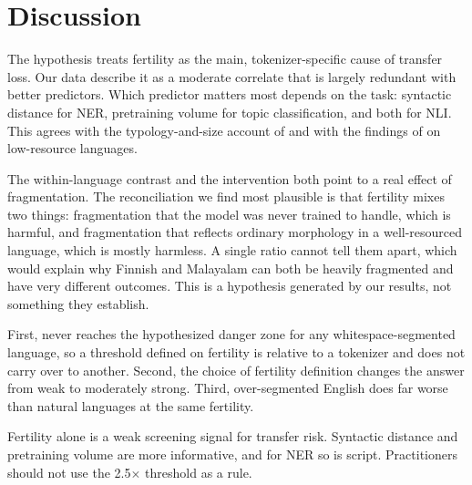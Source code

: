 \section{Discussion}
\label{sec:discussion}

The hypothesis treats fertility as the main, tokenizer-specific cause of transfer loss.
Our data describe it as a moderate correlate that is largely redundant with better predictors.
Which predictor matters most depends on the task: syntactic distance for NER, pretraining volume for topic classification, and both for NLI.
This agrees with the typology-and-size account of \citet{lauscher2020zero} and with the findings of \citet{wu2020all} on low-resource languages.

The within-language contrast and the intervention both point to a real effect of fragmentation.
The reconciliation we find most plausible is that fertility mixes two things: fragmentation that the model was never trained to handle, which is harmful, and fragmentation that reflects ordinary morphology in a well-resourced language, which is mostly harmless.
A single ratio cannot tell them apart, which would explain why Finnish and Malayalam can both be heavily fragmented and have very different outcomes.
This is a hypothesis generated by our results, not something they establish.

First, \xlmr never reaches the hypothesized danger zone for any whitespace-segmented language, so a threshold defined on fertility is relative to a tokenizer and does not carry over to another.
Second, the choice of fertility definition changes the \sib answer from weak to moderately strong.
Third, over-segmented English does far worse than natural languages at the same fertility.

Fertility alone is a weak screening signal for transfer risk.
Syntactic distance and pretraining volume are more informative, and for NER so is script.
Practitioners should not use the 2.5$\times$ threshold as a rule.

